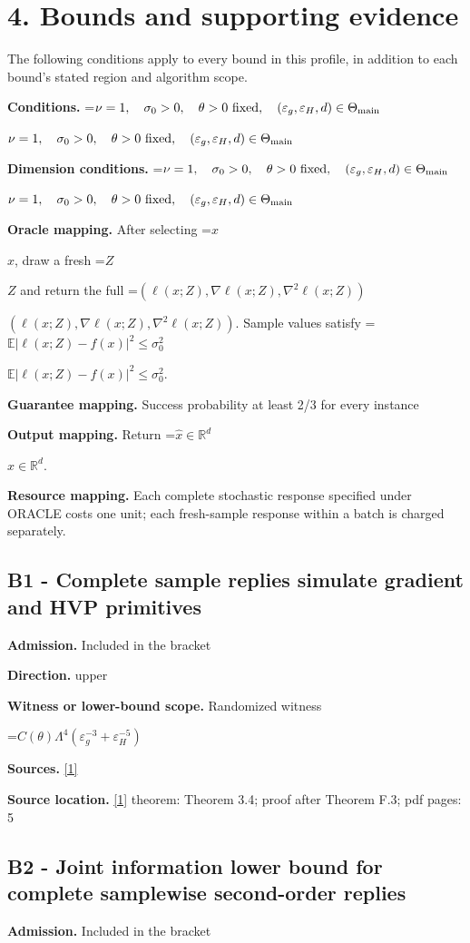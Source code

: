\documentclass[10pt,a4paper]{article}
\newcommand{\AtlasMath}[1]{\par\begingroup\centering\setbox0=\hbox{$\displaystyle #1$}\ifdim\wd0>1.4\linewidth\typeout{ATLAS WIDE FORMULA: \the\wd0}\fi\ifdim\wd0>\linewidth\resizebox{\linewidth}{!}{\box0}\else\box0\fi\par\endgroup}
\newcommand{\AtlasInlineMath}[1]{\begingroup\setbox0=\hbox{$#1$}\ifdim\wd0>.4\linewidth\endgroup\AtlasMath{#1}\else\endgroup$#1$\fi}
\begin{document}
\section{4. Bounds and supporting evidence}
The following conditions apply to every bound in this profile, in addition to each bound's stated region and algorithm scope.

\textbf{Conditions.} \AtlasInlineMath{\nu=1,\quad\sigma_0>0,\quad\theta>0\ {\rm fixed},\quad(\varepsilon_g,\varepsilon_H,d)\in\Theta_{\rm main}}

\textbf{Dimension conditions.} \AtlasInlineMath{\nu=1,\quad\sigma_0>0,\quad\theta>0\ {\rm fixed},\quad(\varepsilon_g,\varepsilon_H,d)\in\Theta_{\rm main}}

\textbf{Oracle mapping.} After selecting \AtlasInlineMath{x}, draw a fresh \AtlasInlineMath{Z} and return the full \AtlasInlineMath{(\ell(x;Z),\nabla\ell(x;Z),\nabla^2\ell(x;Z))}. Sample values satisfy \AtlasInlineMath{\mathbb{E}|\ell(x;Z)-f(x)|^2\le\sigma_0^2}.

\textbf{Guarantee mapping.} Success probability at least 2/3 for every instance

\textbf{Output mapping.} Return \AtlasInlineMath{\widehat{x}\in \mathbb{R}^d}.

\textbf{Resource mapping.} Each complete stochastic response specified under ORACLE costs one unit; each fresh-sample response within a batch is charged separately.

\subsection{B1 - Complete sample replies simulate gradient and HVP primitives}
\textbf{Admission.} Included in the bracket

\textbf{Direction.} upper

\textbf{Witness or lower-bound scope.} Randomized witness

\AtlasMath{C(\theta)\Lambda^4(\varepsilon_g^{-3}+\varepsilon_H^{-5})}
\textbf{Sources.} \href{https://arxiv.org/pdf/2609.28238v2}{[1]}

\textbf{Source location.} \href{https://arxiv.org/pdf/2609.28238v2}{[1]} theorem: Theorem 3.4; proof after Theorem F.3; pdf pages: 5

\subsection{B2 - Joint information lower bound for complete samplewise second-order replies}
\textbf{Admission.} Included in the bracket
\end{document}
